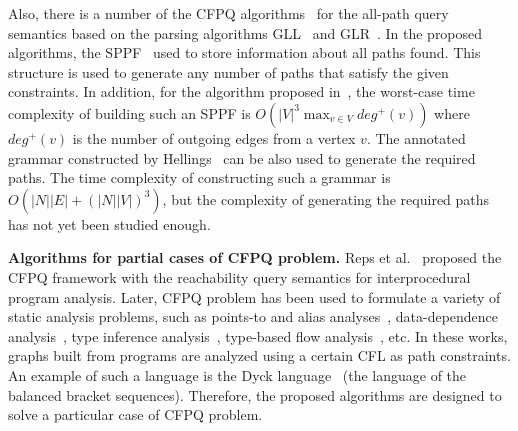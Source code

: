 Also, there is a number of the CFPQ algorithms~\cite{grigorev2017context, verbitskaia2015relaxed, verbitskaia2018parser} for the all-path query semantics based on the parsing algorithms GLL~\cite{scott2010gll} and GLR~\cite{scott2007brnglr}. In the proposed algorithms, the SPPF~\cite{tomita1984lr} used to store information about all paths found. This structure is used to generate any number of paths that satisfy the given constraints. In addition, for the algorithm proposed in~\cite{grigorev2017context}, the worst-case time complexity of building such an SPPF is $O(|V|^3 \max_{v \in V} deg^+(v))$ where $deg^+(v)$ is the number of outgoing edges from a vertex $v$. The annotated grammar constructed by Hellings~\cite{hellings2015querying} can be also used to generate the required paths. The time complexity of constructing such a grammar is $O(|N||E| + (|N||V|)^3)$, but the complexity of generating the required paths has not yet been studied enough.

\textbf{Algorithms for partial cases of CFPQ problem.} Reps et al.~\cite{horwitz1995demand,reps1998program,reps1995precise} proposed the CFPQ framework with the reachability query semantics for interprocedural program analysis. Later, CFPQ problem has been used to formulate a variety of static analysis problems, such as points-to and alias analyses~\cite{chatterjee2017optimal,dietrich2015giga,lu2013incremental,sridharan2005demand,yan2011demand,zheng2008demand}, data-dependence analysis~\cite{chatterjee2017optimal}, type inference analysis~\cite{milanova2014cfl}, type-based flow analysis~\cite{rehof2001type}, etc. In these works, graphs built from programs are analyzed using a certain CFL as path constraints. An example of such a language is the Dyck language~\cite{reps1998program} (the language of the balanced bracket sequences). Therefore, the proposed algorithms are designed to solve a particular case of CFPQ problem.


